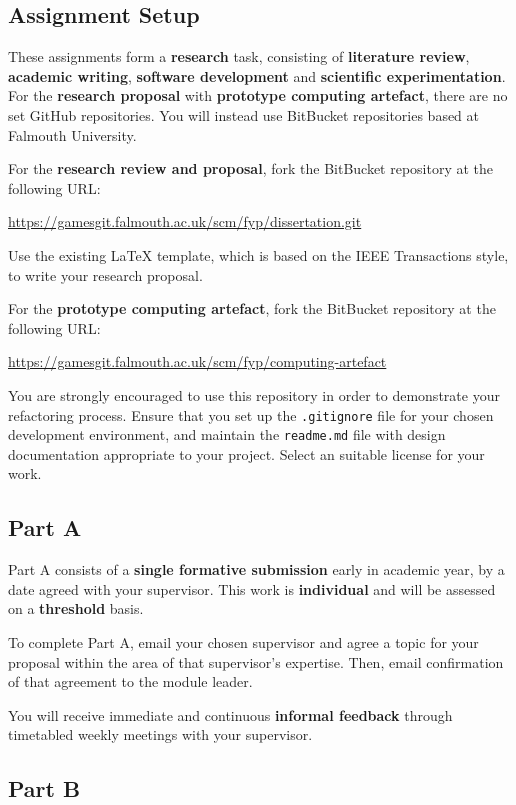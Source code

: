 \subsection*{Assignment Setup}

These assignments form a \textbf{research} task, consisting of \textbf{literature review}, \textbf{academic writing},
\textbf{software development} and \textbf{scientific experimentation}. For the \textbf{research proposal} with \textbf{prototype computing artefact}, there are no set GitHub repositories. You will instead use BitBucket repositories based at Falmouth University. 

For the \textbf{research review and proposal}, fork the BitBucket repository at the following URL:

\indent \url{https://gamesgit.falmouth.ac.uk/scm/fyp/dissertation.git}

Use the existing LaTeX template, which is based on the IEEE Transactions style,
to write your research proposal.

For the \textbf{prototype computing artefact}, fork the BitBucket repository at the following URL:

\indent \url{https://gamesgit.falmouth.ac.uk/scm/fyp/computing-artefact}

You are strongly encouraged to use this repository in order to demonstrate your refactoring process.
Ensure that you set up the \texttt{.gitignore} file for your chosen development environment,
and maintain the \texttt{readme.md} file with design documentation appropriate to your project. Select
an suitable license for your work.

\subsection*{Part A}

Part A consists of a \textbf{single formative submission} early in academic year, by a date agreed with your supervisor.
This work is \textbf{individual} and will be assessed on a \textbf{threshold} basis.

To complete Part A, email your chosen supervisor and agree a topic for your proposal within the area of that
supervisor's expertise. Then, email confirmation of that agreement to the module leader.

You will receive immediate and continuous \textbf{informal feedback} through timetabled weekly meetings with your supervisor.

\subsection*{Part B}

